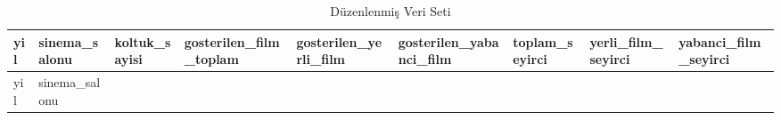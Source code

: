 \documentclass[
  letterpaper,
  DIV=11,
  numbers=noendperiod]{scrartcl}
\begin{document}
\begin{longtable}[]{@{}
  >{\raggedleft\arraybackslash}p{}
  >{\raggedleft\arraybackslash}p{}
  >{\raggedleft\arraybackslash}p{}
  >{\raggedleft\arraybackslash}p{}
  >{\raggedleft\arraybackslash}p{}
  >{\raggedleft\arraybackslash}p{}
  >{\raggedleft\arraybackslash}p{}
  >{\raggedleft\arraybackslash}p{}
  >{\raggedleft\arraybackslash}p{}@{}}
\caption{Düzenlenmiş Veri Seti}\tabularnewline
\toprule\noalign{}
\begin{minipage}[b]{\linewidth}\raggedleft
yil
\end{minipage} & \begin{minipage}[b]{\linewidth}\raggedleft
sinema\_salonu
\end{minipage} & \begin{minipage}[b]{\linewidth}\raggedleft
koltuk\_sayisi
\end{minipage} & \begin{minipage}[b]{\linewidth}\raggedleft
gosterilen\_film\_toplam
\end{minipage} & \begin{minipage}[b]{\linewidth}\raggedleft
gosterilen\_yerli\_film
\end{minipage} & \begin{minipage}[b]{\linewidth}\raggedleft
gosterilen\_yabanci\_film
\end{minipage} & \begin{minipage}[b]{\linewidth}\raggedleft
toplam\_seyirci
\end{minipage} & \begin{minipage}[b]{\linewidth}\raggedleft
yerli\_film\_seyirci
\end{minipage} & \begin{minipage}[b]{\linewidth}\raggedleft
yabanci\_film\_seyirci
\end{minipage} \\
\midrule\noalign{}
\endfirsthead
\toprule\noalign{}
\begin{minipage}[b]{\linewidth}\raggedleft
yil
\end{minipage} & \begin{minipage}[b]{\linewidth}\raggedleft
sinema\_salonu

\end{minipage}
\end{longtable}
\end{document}
